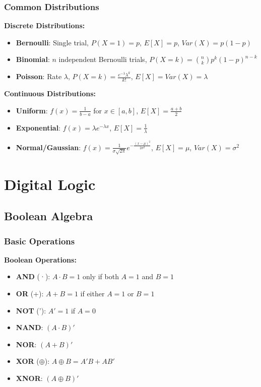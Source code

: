 \documentclass[12pt,a4paper]{report}
\begin{document}
\subsection{Common Distributions}
\begin{concept}
\textbf{Discrete Distributions:}
\begin{itemize}
    \item \textbf{Bernoulli}: Single trial, $P(X=1) = p$, $E[X] = p$, $Var(X) = p(1-p)$
    \item \textbf{Binomial}: $n$ independent Bernoulli trials, $P(X=k) = \binom{n}{k}p^k(1-p)^{n-k}$
    \item \textbf{Poisson}: Rate $\lambda$, $P(X=k) = \frac{e^{-\lambda}\lambda^k}{k!}$, $E[X] = Var(X) = \lambda$
\end{itemize}

\textbf{Continuous Distributions:}
\begin{itemize}
    \item \textbf{Uniform}: $f(x) = \frac{1}{b-a}$ for $x \in [a,b]$, $E[X] = \frac{a+b}{2}$
    \item \textbf{Exponential}: $f(x) = \lambda e^{-\lambda x}$, $E[X] = \frac{1}{\lambda}$
    \item \textbf{Normal/Gaussian}: $f(x) = \frac{1}{\sigma\sqrt{2\pi}}e^{-\frac{(x-\mu)^2}{2\sigma^2}}$, $E[X] = \mu$, $Var(X) = \sigma^2$
\end{itemize}
\end{concept}

\chapter{Digital Logic}

\section{Boolean Algebra}

\subsection{Basic Operations}
\begin{concept}
\textbf{Boolean Operations:}
\begin{itemize}
    \item \textbf{AND} (·): $A \cdot B = 1$ only if both $A=1$ and $B=1$
    \item \textbf{OR} (+): $A + B = 1$ if either $A=1$ or $B=1$
    \item \textbf{NOT} ('): $A' = 1$ if $A=0$
    \item \textbf{NAND}: $(A \cdot B)'$
    \item \textbf{NOR}: $(A + B)'$
    \item \textbf{XOR} ($\oplus$): $A \oplus B = A'B + AB'$
    \item \textbf{XNOR}: $(A \oplus B)'$
\end{itemize}
\end{concept}
\end{document}
